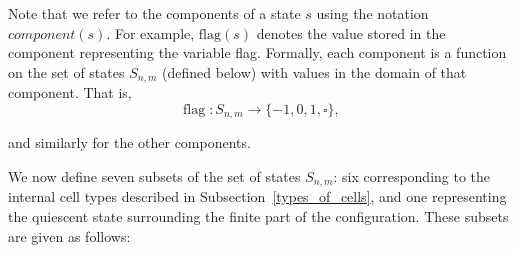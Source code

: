 \documentclass{article}
\theoremstyle{plain}
\theoremstyle{definition}
\DeclareMathOperator{\flag}{flag}
\begin{document}
Note that we refer to the components of a state $s$ using the notation \linebreak
$\textit{component}(s)$. For example, $\mathrm{flag}(s)$ denotes the value stored in
the component representing the variable flag. Formally, each component is a function on the set of states $S_{n,m}$ (defined below)
with values in the domain of that component. That is, 
\[
\flag: S_{n,m} \to \{-1, 0, 1, \square\},
\]

and similarly for the other components.

We now define seven subsets of the set of states $S_{n,m}$: six corresponding to the internal cell types described in Subsection~\ref{types_of_cells}, and one representing the quiescent state surrounding the finite part of the configuration. These subsets are given as follows:
\end{document}
